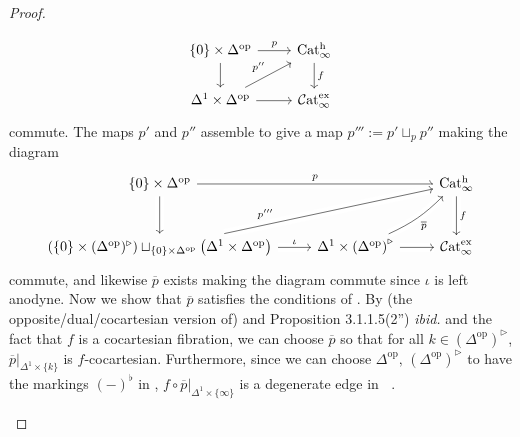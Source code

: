 \documentclass{article}
\DeclareMathOperator{\Cat}{\mathcal{C}at} %
\DeclareMathOperator{\Catex}{\Cat_\infty^{ex}} %
\DeclareMathOperator{\Cath}{Cat^h_\infty} %
\newcommand{\op}{\mathrm{op}} %
\theoremstyle{definition}
\begin{document}
\begin{proof}
\begin{enumerate}[label=(\arabic*)]
\begin{equation*}
        \begin{tikzcd}
            \{0\} \times \Delta^\op \ar[r,"p"]\ar[d] &\Cath \ar[d,"f"] \\
            \Delta^1 \times \Delta^\op \ar[r] \ar[ru,"{p''}"] & \Catex
        \end{tikzcd}
        \end{equation*}
        commute. 
        The maps $ p' $ and $ p'' $ assemble to give a map $ p''' := p' \sqcup_p p'' $ making the diagram 
        \begin{equation*}
        \begin{tikzcd}[arrows={crossing over},row sep=large]
             \{0\} \times \Delta^\op \ar[rr,"p"]\ar[d] &  &\Cath \ar[d,"f"] \\
            \left(\{0\} \times (\Delta^\op)^\triangleright\right) \sqcup_{\{0\} \times \Delta^\op}\left(\Delta^1 \times \Delta^\op \right) \ar[r,"\iota"] \ar[rru,"{p'''}", near start] & \Delta^1 \times \left(\Delta^\op\right)^\triangleright \ar[r] \ar[ru,"{\overline{p}}"', bend right=10] & \Catex
        \end{tikzcd}
        \end{equation*}
        commute, and likewise $ \overline{p} $ exists making the diagram commute since $ \iota $ is left anodyne. 
        Now we show that $ \overline{p} $ satisfies the conditions of \cite[Proposition 4.3.1.9]{HTT}. 
        By (the opposite/dual/cocartesian version of) \cite[Remark 3.1.1.10]{HTT} and Proposition 3.1.1.5(2'') \emph{ibid.} and the fact that $ f $ is a cocartesian fibration, we can choose $ \overline{p} $ so that for all $ k \in (\Delta^\op)^\triangleright $, $ \overline{p}|_{\Delta^1 \times \{k\}} $ is $f$-cocartesian. 
        Furthermore, since we can choose $ \Delta^\op, \,\left(\Delta^\op\right)^\triangleright $ to have the markings $ (-)^\flat $ in \cite[Remark 3.1.1.10]{HTT}, $ f \circ \overline{p}|_{\Delta^1 \times \{\infty\}} $ is a degenerate edge in $ \Catex $. 


\end{enumerate}
\end{proof}
\end{document}
